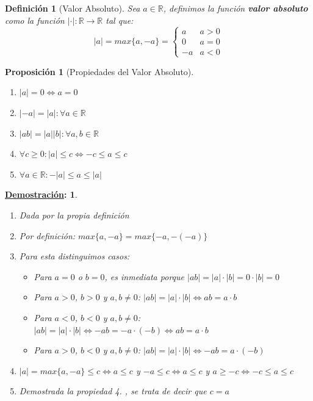 \documentclass[10pt,a4paper,openright]{book}
\theoremstyle{break}
\newtheorem*{defi}{Definición}
\newtheorem*{prop}{Proposición}
\newtheorem*{demo}{\underline{Demostración}:}
\begin{document}
\begin{defi}[Valor Absoluto]
Sea $a\in \mathbb R$, definimos la función \textbf{valor absoluto} como la función $|\cdot| : \mathbb{R}\rightarrow \mathbb{R}$ tal que:
$$
|a|=max\{a,-a\} =
\begin{cases}
a & a>0 \\
0 & a=0 \\
-a & a<0
\end{cases}
$$
\end{defi}

\begin{prop}[Propiedades del Valor Absoluto]
\begin{enumerate}
\item $|a|=0\Leftrightarrow a=0$
\item $|-a|=|a|: \forall a \in \mathbb R$
\item $|ab|=|a||b|: \forall a,b\in \mathbb R$
\item $\forall c\geq 0: |a|\leq c \Leftrightarrow -c\leq a\leq c$
\item $\forall a \in \mathbb R: -|a|\leq a\leq |a|$
\end{enumerate}
\end{prop}
\begin{demo}
\begin{enumerate}
\item Dada por la propia definición
\item Por definición: $max\{a,-a\}=max\{-a,-(-a)\}$
\item Para esta distinguimos casos:
	\begin{itemize}
	\item Para $a=0$ o $b=0$, es inmediata porque $|ab|=|a|\cdot |b|=0\cdot |b|=0$
	\item Para $a>0$, $b>0$ y $a,b\neq 0$: $|ab|=|a|\cdot |b|\Leftrightarrow ab=a\cdot b$
	\item Para $a<0$, $b<0$ y $a,b\neq 0$:$|ab|=|a|\cdot |b|\Leftrightarrow -ab=-a\cdot (-b)\Leftrightarrow ab=a\cdot b$
	\item Para $a>0$, $b<0$ y $a,b\neq 0$: $|ab|=|a|\cdot |b|\Leftrightarrow -ab=a\cdot(-b)$
	\end{itemize}

\item $|a|=max\{a,-a\}\leq c\Leftrightarrow a\leq c$ y $-a\leq c\Leftrightarrow a\leq c$ y $a\geq -c\Leftrightarrow -c\leq a\leq c$
\item Demostrada la propiedad 4. , se trata de decir que $c=a$
\end{enumerate}
\end{demo}
\end{document}
